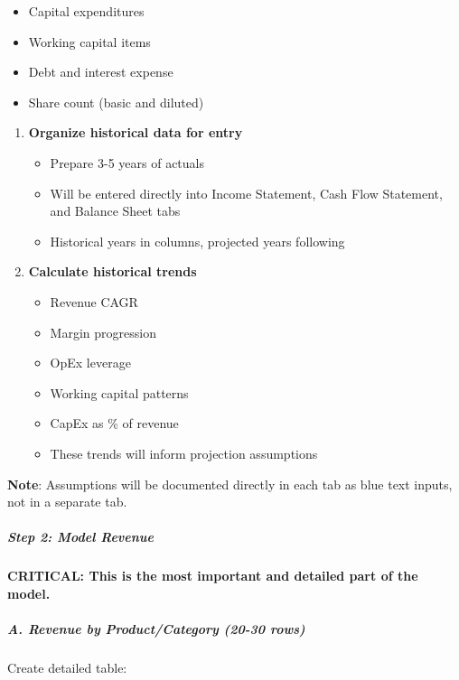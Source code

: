 \documentclass[11pt]{article}
\begin{document}
\begin{itemize}[leftmargin=*,itemsep=2pt,topsep=2pt]
\item {} Capital expenditures
\item {} Working capital items
\item {} Debt and interest expense
\item {} Share count (basic and diluted)
\end{itemize}
\begin{enumerate}[leftmargin=*,itemsep=2pt,topsep=2pt]
\item {} \textbf{Organize historical data for entry}
\begin{itemize}[leftmargin=*,itemsep=2pt,topsep=2pt]
\item {} Prepare 3-5 years of actuals
\item {} Will be entered directly into Income Statement, Cash Flow Statement, and Balance Sheet tabs
\item {} Historical years in columns, projected years following
\end{itemize}
\item {} \textbf{Calculate historical trends}
\begin{itemize}[leftmargin=*,itemsep=2pt,topsep=2pt]
\item {} Revenue CAGR
\item {} Margin progression
\item {} OpEx leverage
\item {} Working capital patterns
\item {} CapEx as \% of revenue
\item {} These trends will inform projection assumptions
\end{itemize}
\end{enumerate}

\textbf{Note}: Assumptions will be documented directly in each tab as blue text inputs, not in a separate tab.


\subparagraph{Step 2: Model Revenue}\mbox{}\par

\textbf{CRITICAL: This is the most important and detailed part of the model.}


\subparagraph{A. Revenue by Product/Category (20-30 rows)}\mbox{}\par

Create detailed table:
\end{document}
